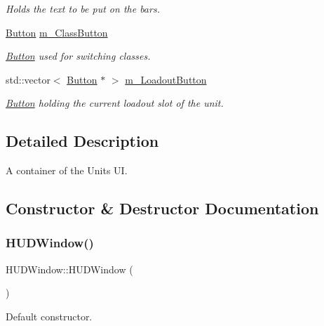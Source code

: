 \begin{DoxyCompactItemize}
\begin{DoxyCompactList}\small\item\em Holds the text to be put on the bars. \end{DoxyCompactList}\item 
\hyperlink{class_button}{Button} \hyperlink{class_h_u_d_window_a6a019f798171deebfb65328d0fbad30c}{m\+\_\+\+Class\+Button}
\begin{DoxyCompactList}\small\item\em \hyperlink{class_button}{Button} used for switching classes. \end{DoxyCompactList}\item 
std\+::vector$<$ \hyperlink{class_button}{Button} $\ast$ $>$ \hyperlink{class_h_u_d_window_aa5f784c0fa464b7009574d64300c9279}{m\+\_\+\+Loadout\+Button}
\begin{DoxyCompactList}\small\item\em \hyperlink{class_button}{Button} holding the current loadout slot of the unit. \end{DoxyCompactList}\end{DoxyCompactItemize}


\subsection{Detailed Description}
A container of the Units UI. 

\subsection{Constructor \& Destructor Documentation}
\mbox{\label{class_h_u_d_window_a0a3a8f276b89dfacaf2a65484a3b11c8}} 
\subsubsection{\texorpdfstring{H\+U\+D\+Window()}{HUDWindow()}}
{\footnotesize\ttfamily H\+U\+D\+Window\+::\+H\+U\+D\+Window (\begin{DoxyParamCaption}{ }\end{DoxyParamCaption})}



Default constructor. 

\mbox{\label{class_h_u_d_window_a6dfe3235d28ad412564f5bfe53a1b312}} 

